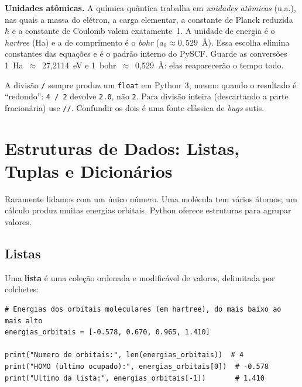 \documentclass[11pt,a4paper,openany]{book}
\newcommand{\code}[1]{\texttt{#1}}
\newcommand{\pyscf}{\textsf{PySCF}}
\newcommand{\python}{\textsf{Python}}
\begin{document}
\begin{caixanota}
\textbf{Unidades atômicas.} A química quântica trabalha em \emph{unidades
atômicas} (u.a.), nas quais a massa do elétron, a carga elementar, a constante
de Planck reduzida $\hbar$ e a constante de Coulomb valem exatamente~1. A unidade
de energia é o \emph{hartree} (Ha) e a de comprimento é o \emph{bohr}
($a_0 \approx 0{,}529$~Å). Essa escolha elimina constantes das equações e é o
padrão interno do \pyscf{}. Guarde as conversões
1~Ha~$\approx$~27{,}2114~eV e 1~bohr~$\approx$~0{,}529~Å: elas reaparecerão o
tempo todo.
\end{caixanota}

\begin{caixaatencao}
A divisão \code{/} sempre produz um \code{float} em \python{}~3, mesmo quando o
resultado é ``redondo'': \code{4 / 2} devolve \code{2.0}, não \code{2}. Para divisão
inteira (descartando a parte fracionária) use \code{//}. Confundir os dois é uma
fonte clássica de \emph{bugs} sutis.
\end{caixaatencao}

\section{Estruturas de Dados: Listas, Tuplas e Dicionários}
\label{sec:estruturas}

Raramente lidamos com um único número. Uma molécula tem vários átomos; um cálculo
produz muitas energias orbitais. \python{} oferece estruturas para agrupar
valores.

\subsection{Listas}

Uma \textbf{lista} é uma coleção ordenada e modificável de valores, delimitada por
colchetes:

\begin{lstlisting}[style=python,caption={Energias orbitais em uma lista.},label={lst:lista}]
# Energias dos orbitais moleculares (em hartree), do mais baixo ao mais alto
energias_orbitais = [-0.578, 0.670, 0.965, 1.410]

print("Numero de orbitais:", len(energias_orbitais))  # 4
print("HOMO (ultimo ocupado):", energias_orbitais[0])  # -0.578
print("Ultimo da lista:", energias_orbitais[-1])       # 1.410
\end{lstlisting}
\end{document}
